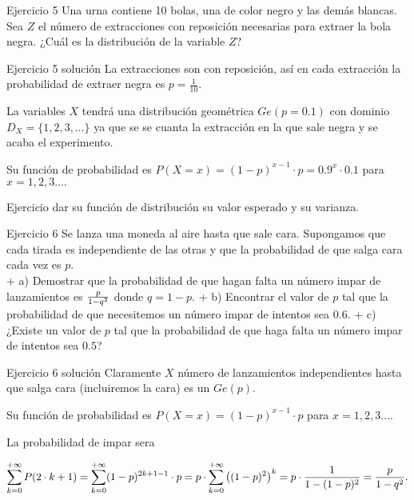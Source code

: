 \documentclass[
  ignorenonframetext,
]{beamer}
\begin{document}
\begin{frame}{Ejercicio 5}
\protect\hypertarget{ejercicio-5}{}
Una urna contiene 10 bolas, una de color negro y las demás blancas. Sea
\(Z\) el número de extracciones con reposición necesarias para extraer
la bola negra. ¿Cuál es la distribución de la variable \(Z\)?
\end{frame}

\begin{frame}{Ejercicio 5 solución}
\protect\hypertarget{ejercicio-5-soluciuxf3n}{}
La extracciones son con reposición, así en cada extracción la
probabilidad de extraer negra es \(p=\frac{1}{10}\).

La variables \(X\) tendrá una distribución geométrica \(Ge(p=0.1)\) con
dominio \(D_X=\{1,2,3,\ldots\}\) ya que se se cuanta la extracción en la
que sale negra y se acaba el experimento.

Su función de probabilidad es
\(P(X=x)=(1-p)^{x-1}\cdot p=0.9^x \cdot 0.1\) para \(x=1,2,3\ldots.\)

Ejercicio dar su función de distribución su valor esperado y su
varianza.
\end{frame}

\begin{frame}{Ejercicio 6}
\protect\hypertarget{ejercicio-6}{}
Se lanza una moneda al aire hasta que sale cara. Supongamos que cada
tirada es independiente de las otras y que la probabilidad de que salga
cara cada vez es \(p\).\\
+ a) Demostrar que la probabilidad de que hagan falta un número impar de
lanzamientos es \({p\over 1-q^2}\) donde \(q=1-p\). + b) Encontrar el
valor de \(p\) tal que la probabilidad de que necesitemos un número
impar de intentos sea \(0.6\). + c) ¿Existe un valor de \(p\) tal que la
probabilidad de que haga falta un número impar de intentos sea \(0.5\)?
\end{frame}

\begin{frame}{Ejercicio 6 solución}
\protect\hypertarget{ejercicio-6-soluciuxf3n}{}
Claramente \(X\) número de lanzamientos independientes hasta que salga
cara (incluiremos la cara) es un \(Ge(p)\).

Su función de probabilidad es \(P(X=x)=(1-p)^{x-1}\cdot p\) para
\(x=1,2,3\ldots.\)

La probabilidad de impar sera

\[
\small{
\sum_{k=0}^{+\infty}P(2\cdot k +1)=\sum_{k=0}^{+\infty} (1-p)^{2k+1-1}\cdot p=
p \cdot \sum_{k=0}^{+\infty} \left((1-p)^{2}\right)^k=p\cdot \frac{1}{1-(1-p)^2}= \frac{p}{1-q^2}.
}
\]
\end{frame}
\end{document}
